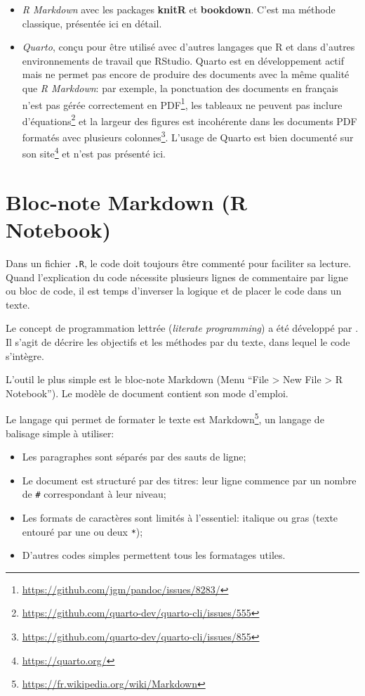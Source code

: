 \documentclass[
  12pt,
  french,
  a4paper,
  extrafontsizes,onecolumn,openright
  ]{memoir}
\providecommand{\tightlist}{%
  \setlength{\itemsep}{0pt}\setlength{\parskip}{0pt}}
\begin{document}
\begin{itemize}
\tightlist
\item
  \emph{R Markdown} avec les packages \textbf{knitR} et \textbf{bookdown}.
  C'est ma méthode classique, présentée ici en détail.
\item
  \emph{Quarto}, conçu pour être utilisé avec d'autres langages que R et dans d'autres environnements de travail que RStudio.
  Quarto est en développement actif mais ne permet pas encore de produire des documents avec la même qualité que \emph{R Markdown}: par exemple, la ponctuation des documents en français n'est pas gérée correctement en PDF\footnote{\url{https://github.com/jgm/pandoc/issues/8283/}}, les tableaux ne peuvent pas inclure d'équations\footnote{\url{https://github.com/quarto-dev/quarto-cli/issues/555}} et la largeur des figures est incohérente dans les documents PDF formatés avec plusieurs colonnes\footnote{\url{https://github.com/quarto-dev/quarto-cli/issues/855}}.
  L'usage de Quarto est bien documenté sur son site\footnote{\url{https://quarto.org/}} et n'est pas présenté ici.
\end{itemize}

\section{Bloc-note Markdown (R Notebook)}\label{bloc-note-markdown-r-notebook}

Dans un fichier \texttt{.R}, le code doit toujours être commenté pour faciliter sa lecture.
Quand l'explication du code nécessite plusieurs lignes de commentaire par ligne ou bloc de code, il est temps d'inverser la logique et de placer le code dans un texte.

Le concept de programmation lettrée (\emph{literate programming}) a été développé par \textcite{Knuth1984}.
Il s'agit de décrire les objectifs et les méthodes par du texte, dans lequel le code s'intègre.

L'outil le plus simple est le bloc-note Markdown (Menu \enquote{File \textgreater{} New File \textgreater{} R Notebook}).
Le modèle de document contient son mode d'emploi.

Le langage qui permet de formater le texte est Markdown\footnote{\url{https://fr.wikipedia.org/wiki/Markdown}}, un langage de balisage simple à utiliser:

\begin{itemize}
\tightlist
\item
  Les paragraphes sont séparés par des sauts de ligne;
\item
  Le document est structuré par des titres: leur ligne commence par un nombre de \texttt{\#} correspondant à leur niveau;
\item
  Les formats de caractères sont limités à l'essentiel: italique ou gras (texte entouré par une ou deux \texttt{*});
\item
  D'autres codes simples permettent tous les formatages utiles.
\end{itemize}
\end{document}
